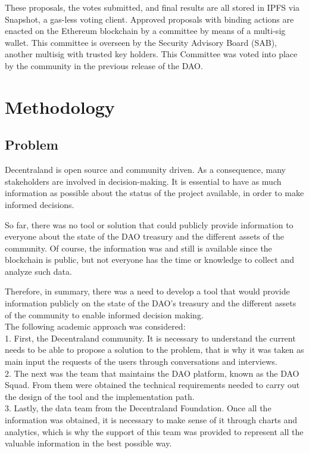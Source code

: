 \documentclass[MSE,Master,english]{twbook}%
\begin{document}
These proposals, the votes submitted, and final results are all stored in IPFS via Snapshot, a gas-less voting client. Approved proposals with binding actions are enacted on the Ethereum blockchain by a committee by means of a multi-sig wallet. This committee is overseen by the Security Advisory Board (SAB), another multisig with trusted key holders. This Committee was voted into place by the community in the previous release of the DAO.

\chapter{Methodology\label{method}}
\section{Problem}
Decentraland is open source and community driven. As a consequence, many stakeholders are involved in decision-making. It is essential to have as much information as possible about the status of the project available, in order to make informed decisions.

So far, there was no tool or solution that could publicly provide information to everyone about the state of the DAO treasury and the different assets of the community. Of course, the information was and still is available since the blockchain is public, but not everyone has the time or knowledge to collect and analyze such data.

Therefore, in summary, there was a need to develop a tool that would provide information publicly on the state of the DAO's treasury and the different assets of the community to enable informed decision making. \\

The following academic approach was considered: \\

1. First, the Decentraland community. It is necessary to understand the current needs to be able to propose a solution to the problem, that is why it was taken as main input the requests of the users through conversations and interviews. \\

2. The next was the team that maintains the DAO platform, known as the DAO Squad. From them were obtained the technical requirements needed to carry out the design of the tool and the implementation path.\\

3. Lastly, the data team from the Decentraland Foundation. Once all the information was obtained, it is necessary to make sense of it through charts and analytics, which is why the support of this team was provided to represent all the valuable information in the best possible way.\\
\end{document}
